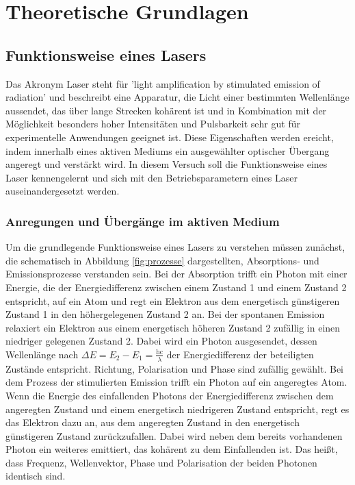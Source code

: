\section{Theoretische Grundlagen}
    
    \subsection{Funktionsweise eines Lasers}
        Das Akronym Laser steht für 'light amplification by stimulated emission of radiation' und beschreibt eine Apparatur, die Licht einer bestimmten Wellenlänge aussendet, das über lange Strecken kohärent 
        ist und in Kombination mit der Möglichkeit besonders hoher Intensitäten und Pulsbarkeit sehr gut für experimentelle Anwendungen geeignet ist. Diese Eigenschaften werden ereicht, indem innerhalb eines 
        aktiven Mediums ein ausgewählter optischer Übergang angeregt und verstärkt wird. In diesem Versuch soll die Funktionsweise eines Laser kennengelernt und sich mit
        den Betriebsparametern eines Laser auseinandergesetzt werden. 
        
        \subsubsection{Anregungen und Übergänge im aktiven Medium}
            Um die grundlegende Funktionsweise eines Lasers zu verstehen müssen zunächst, die schematisch in Abbildung \ref{fig:prozesse} dargestellten, Absorptions- und Emissionsprozesse verstanden sein. Bei 
            der Absorption trifft ein Photon mit einer Energie, die der Energiedifferenz zwischen einem Zustand 1 und einem Zustand 2 entspricht, auf ein Atom und regt ein Elektron aus dem energetisch
            günstigeren Zustand 1 in den höhergelegenen Zustand 2 an. Bei der spontanen Emission relaxiert ein Elektron aus einem energetisch höheren Zustand 2 zufällig in einen niedriger gelegenen Zustand 2. Dabei 
            wird ein Photon ausgesendet, dessen Wellenlänge nach $\Delta E = E_2 - E_1 = \frac{\text{hc}}{\lambda}$ der Energiedifferenz der beteiligten Zustände entspricht. Richtung, Polarisation und Phase sind 
            zufällig gewählt. Bei dem 
            Prozess der stimulierten Emission trifft ein Photon auf ein angeregtes Atom. Wenn die Energie des einfallenden Photons der Energiedifferenz zwischen dem angeregten Zustand und einem energetisch
            niedrigeren Zustand entspricht, regt es das Elektron dazu an, aus dem angeregten Zustand in den energetisch günstigeren Zustand zurückzufallen. Dabei wird neben dem bereits vorhandenen Photon ein
            weiteres emittiert, das kohärent zu dem Einfallenden ist. Das heißt, dass Frequenz, Wellenvektor, Phase und Polarisation der beiden Photonen identisch sind.      


